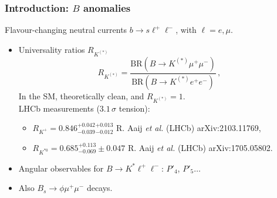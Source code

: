 \documentclass[mathserif, 10pt, dvipsnames]{beamer}
\newcommand\colorcite[1]{{\scriptsize\color{unizarblue}#1}}
\begin{document}
\begin{frame}\frametitle{Introduction: $B$ anomalies}

    Flavour-changing neutral currents $b \to s \ell^+ \ell^-$, with $\ell = e, \mu$.
    \begin{itemize}
        \item Universality ratios $R_{K^{(*)}}$
              $$R_{K^{(*)}} = \frac{\mathrm{BR}(B\to K^{(*)}\mu^+ \mu^-)}{\mathrm{BR}(B\to K^{(*)}e^+ e^-)}\,, $$
In the SM, theoretically clean, and $R_{K^{(*)}}=1$.\\[0.5em]
LHCb measurements ($3.1\,\sigma$ tension):\\[0.3em]
              \begin{itemize}
\item $R_{K^+} = 0.846^{+0.042}_{-0.039}{}^{+0.013}_{-0.012}$ \colorcite{R. Aaij \textit{et al.} (LHCb) arXiv:2103.11769},
\item $R_{K^{*0}} = 0.685^{+0.113}_{-0.069}\pm0.047$ \colorcite{R. Aaij \textit{et al.} (LHCb) arXiv:1705.05802}.\\[0.5em]
              \end{itemize}
        \item Angular observables for $B\to K^* \ell^+\ell^-$: $P'_4$, $P'_5\ldots$
        \item Also $B_s \to \phi \mu^+ \mu^-$ decays.
    \end{itemize}

\end{frame}
\end{document}
